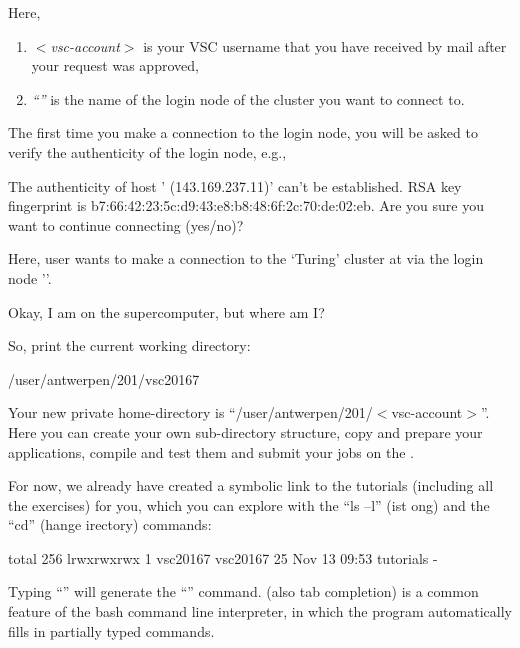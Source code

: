 Here,

\begin{enumerate}
  \item  \emph{$<$vsc-account$>$} is your VSC username that you have received
    by mail after your request was approved,
  \item  \emph{``\loginnode''} is the name of the login
    node of the \hpc cluster you want to connect to.
\end{enumerate}

The first time you make a connection to the login node, you will be asked to
verify the authenticity of the login node, e.g.,

\begin{prompt}
The authenticity of host '%
  (143.169.237.11)' can't be established.
RSA key fingerprint is b7:66:42:23:5c:d9:43:e8:b8:48:6f:2c:70:de:02:eb.
Are you sure you want to continue connecting (yes/no)? %
\end{prompt}

Here, user \userid wants to make a connection to the `Turing' cluster at
\university via the login node '\loginnode'.

\ifantwerpen
{}
\fi
Okay, I am on the supercomputer, but where am I?

So, print the current working directory:
\begin{prompt}
/user/antwerpen/201/vsc20167
\end{prompt}

Your new private home-directory is ``/user/antwerpen/201/$<$vsc-account$>$''.
Here you can create your own sub-directory structure, copy and prepare your
applications, compile and test them and submit your jobs on the \hpc.

For now, we already have created a symbolic link to the tutorials (including
all the exercises) for you, which you can explore with the ``ls --l''
(ist ong) and the ``cd'' (hange
irectory) commands:

\begin{prompt}
total 256
lrwxrwxrwx 1 vsc20167 vsc20167 25 Nov 13 09:53 tutorials -%
\end{prompt}

Typing ``'' will generate the
``'' command. (also tab completion) is a common feature of the bash command line
interpreter, in which the program automatically fills in partially typed
commands.

